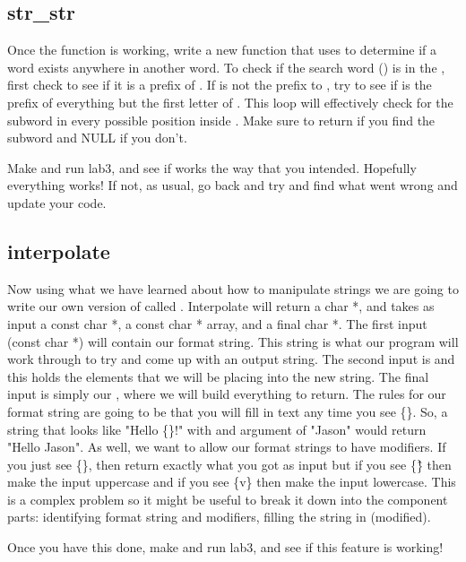 \documentclass{tufte-handout}
\begin{document}
\subsection{str\_str}

Once the function  is working, write a new
function  that uses  to determine if a word exists anywhere in another word. To check if the search word () is in the , first check to see if it is a prefix of . If  is not the prefix to , try to see if  is the prefix of everything but the first letter of . This loop will effectively check for the subword  in every possible position inside . Make sure to return  if you find the subword and NULL if you don't.

Make and run lab3, and see if  works the way that you intended.  Hopefully everything works!  If not, as usual, go back and try and find what went wrong and update your code.

\subsection{interpolate}

Now using what we have learned about how to manipulate strings we are
going to write our own version of  called
. Interpolate will return a char *, and takes
as input a const char *, a const char * array, and a final char *. The
first input (const char *)  will contain our format
string. This string is what our program will work through to try and
come up with an output string. The second input is  and
this holds the elements that we will be placing into the new string. The
final input is simply our , where we will build
everything to return. The rules for our format string are going to be
that you will fill in text any time you see \{\}. So, a string that
looks like "Hello \{\}!" with and argument of "Jason" would return
"Hello Jason". As well, we want to allow our format strings to have
modifiers. If you just see \{\}, then return exactly what you got as
input but if you see \{\^\} then make the input uppercase and if you see
\{v\} then make the input lowercase. This is a complex problem so it might be useful to break it down into the component parts: identifying format string and modifiers, filling the string in (modified).

Once you have this done, make and run lab3, and see if this feature is working!
\end{document}
